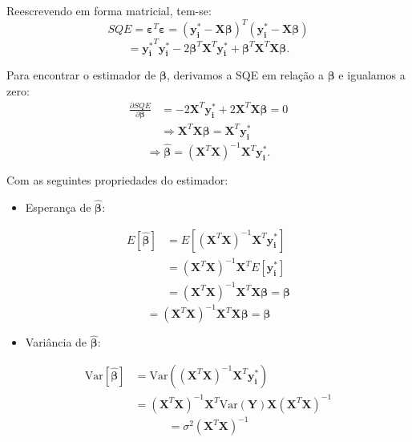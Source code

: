 \documentclass[12pt,a4paper,header]{abnt}
\begin{document}
Reescrevendo em forma matricial, tem-se:
\begin{equation*}
    SQE = \boldsymbol{\varepsilon}^T \boldsymbol{\varepsilon} = (\mathbf{y_i^*} - \mathbf{X} \boldsymbol{\beta})^T (\mathbf{y_i^*} - \mathbf{X} \boldsymbol{\beta})
\end{equation*}
\begin{equation}
    = \mathbf{y_i^*}^T \mathbf{y_i^*} - 2\boldsymbol{\beta}^T \mathbf{X}^T \mathbf{y_i^*} + \boldsymbol{\beta}^T \mathbf{X}^T \mathbf{X} \boldsymbol{\beta}.
\end{equation}

Para encontrar o estimador de \( \boldsymbol{\beta} \), derivamos a SQE em relação a \( \boldsymbol{\beta} \) e igualamos a zero:
\begin{align*}
    \frac{\partial SQE}{\partial \boldsymbol{\beta}} &= -2 \mathbf{X}^T \mathbf{y_i^*} + 2 \mathbf{X}^T \mathbf{X} \boldsymbol{\beta} = 0 \\
    &\Rightarrow \mathbf{X}^T \mathbf{X} \boldsymbol{\beta} = \mathbf{X}^T \mathbf{y_i^*}
\end{align*}
\begin{equation}
    \Rightarrow \hat{\boldsymbol{\beta}} = (\mathbf{X}^T \mathbf{X})^{-1} \mathbf{X}^T \mathbf{y_i^*}.
\end{equation}

Com as seguintes propriedades do estimador:

\begin{itemize}
    \item[\textbf{•}]Esperança de \( \hat{\boldsymbol{\beta}} \):
\end{itemize}
\begin{align*}
    \textit{E}[\hat{\boldsymbol{\beta}}] &= \textit{E}[(\mathbf{X}^T \mathbf{X})^{-1} \mathbf{X}^T \mathbf{y_i^*}] \\
    &= (\mathbf{X}^T \mathbf{X})^{-1} \mathbf{X}^T \textit{E}[\mathbf{y_i^*}] \\
    &= (\mathbf{X}^T \mathbf{X})^{-1} \mathbf{X}^T \mathbf{X} \boldsymbol{\beta} = \boldsymbol{\beta}
\end{align*}
\begin{equation}
    = (\mathbf{X}^T \mathbf{X})^{-1} \mathbf{X}^T \mathbf{X} \boldsymbol{\beta} = \boldsymbol{\beta}
\end{equation}

\begin{itemize}
    \item[\textbf{•}]Variância de \( \hat{\boldsymbol{\beta}} \):
\end{itemize}
\begin{align*}
    \mathrm{Var}[\hat{\boldsymbol{\beta}}] &= \mathrm{Var}((\mathbf{X}^T \mathbf{X})^{-1} \mathbf{X}^T \mathbf{y_i^*}) \\
    &= (\mathbf{X}^T \mathbf{X})^{-1} \mathbf{X}^T \mathrm{Var}(\mathbf{Y}) \mathbf{X} (\mathbf{X}^T \mathbf{X})^{-1}
\end{align*}
\begin{equation}
    = \sigma^2 (\mathbf{X}^T \mathbf{X})^{-1}
\end{equation}
\end{document}
